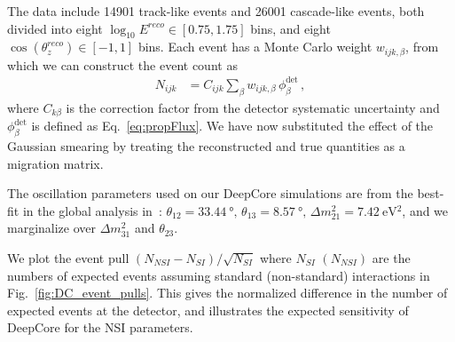 \documentclass[draft=True]{revtex4-2}
\newcommand{\zreco}{\ensuremath{\cos{(\theta_z^{reco})}}}
\newcommand{\dm}{\Delta m^2_{31}}
\begin{document}
The data include 14901 track-like events and 26001 cascade-like events, both divided into eight 
$ \log_{10}E^{reco} \in [0.75,1.75]$ bins, and eight $\zreco \in [-1,1]$ bins. Each event has a Monte Carlo weight $w_{ijk,\beta}$,
from which we can construct the event count as
\begin{align}\label{eq:MCevents}
    N_{ijk} &= C_{ijk}\sum_{\beta}w_{ijk,\beta}\, \phi_\beta^\text{det}\,,
\end{align}
where $C_{k\beta}$ is the correction factor from the detector systematic uncertainty and $\phi_\beta^\text{det}$ is defined as Eq.~\ref{eq:propFlux}. We have now substituted the effect of the Gaussian smearing 
by treating the reconstructed and true quantities as a migration matrix. 

The oscillation parameters used on our DeepCore simulations are from the
best-fit in the global analysis in~\cite{nufit}: $\theta_{12} = \SI{33.44}{\degree},\, \theta_{13} = \SI{8.57}{\degree},\, \Delta m^2_{21} =  \SI{7.42}{\electronvolt^2}$, and we 
marginalize over $\dm$ and $\theta_{23}$.

We plot the event pull $(N_{NSI} - N_{SI})/\sqrt{N_{SI}}$ where $N_{SI}$ $(N_{NSI})$ are the numbers of expected events
assuming standard (non-standard) interactions in Fig.~\ref{fig:DC_event_pulls}. This gives the normalized difference in the
number of expected events at the detector, and illustrates the expected sensitivity of DeepCore for the NSI parameters.
\end{document}
